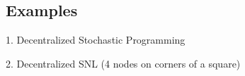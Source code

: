 \subsection{Examples}
1. Decentralized Stochastic Programming

2. Decentralized SNL (4 nodes on corners of a square)